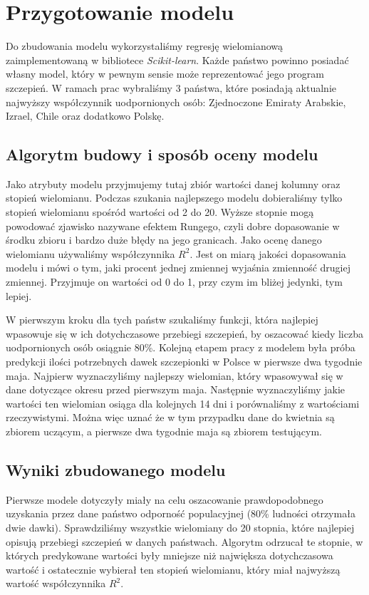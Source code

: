 \documentclass[12pt, oneside]{article}
\begin{document}
\section{Przygotowanie modelu} 

Do zbudowania modelu wykorzystaliśmy regresję wielomianową zaimplementowaną w bibliotece \emph{Scikit-learn}. Każde państwo powinno posiadać własny model, który w pewnym sensie może reprezentować jego program szczepień. W ramach prac wybraliśmy 3 państwa, które posiadają aktualnie najwyższy współczynnik uodpornionych osób: Zjednoczone Emiraty Arabskie, Izrael, Chile oraz dodatkowo Polskę. 

\subsection{Algorytm budowy i sposób oceny modelu}

Jako atrybuty modelu przyjmujemy tutaj zbiór wartości danej kolumny oraz stopień wielomianu. Podczas szukania najlepszego modelu dobieraliśmy tylko stopień wielomianu spośród wartości od 2 do 20. Wyższe stopnie mogą powodować zjawisko nazywane efektem Rungego, czyli dobre dopasowanie w środku zbioru i bardzo duże błędy na jego granicach. Jako ocenę danego wielomianu używaliśmy współczynnika $R^{2}$. Jest on miarą jakości dopasowania modelu i mówi o tym, jaki procent jednej zmiennej wyjaśnia zmienność drugiej zmiennej. Przyjmuje on wartości od 0 do 1, przy czym im bliżej jedynki, tym lepiej.

W pierwszym kroku dla tych państw szukaliśmy funkcji, która najlepiej wpasowuje się w ich dotychczasowe przebiegi szczepień, by oszacować kiedy liczba uodpornionych osób osiągnie 80\%. Kolejną etapem pracy z modelem była próba predykcji ilości potrzebnych dawek szczepionki w Polsce w pierwsze dwa tygodnie maja. Najpierw wyznaczyliśmy najlepszy wielomian, który wpasowywał się w dane dotyczące okresu przed pierwszym maja. Następnie wyznaczyliśmy jakie wartości ten wielomian osiąga dla kolejnych 14 dni i porównaliśmy z wartościami rzeczywistymi. Można więc uznać że w tym przypadku dane do kwietnia są zbiorem uczącym, a pierwsze dwa tygodnie maja są zbiorem testującym.   

\subsection{Wyniki zbudowanego modelu}

Pierwsze modele dotyczyły miały na celu oszacowanie prawdopodobnego uzyskania przez dane państwo odporność populacyjnej (80\% ludności otrzymała dwie dawki). Sprawdziliśmy wszystkie wielomiany do 20 stopnia, które najlepiej opisują przebiegi szczepień w danych państwach. Algorytm odrzucał te stopnie, w których predykowane wartości były mniejsze niż największa dotychczasowa wartość i ostatecznie wybierał ten stopień wielomianu, który miał najwyższą wartość współczynnika $R^2$. 
\end{document}

